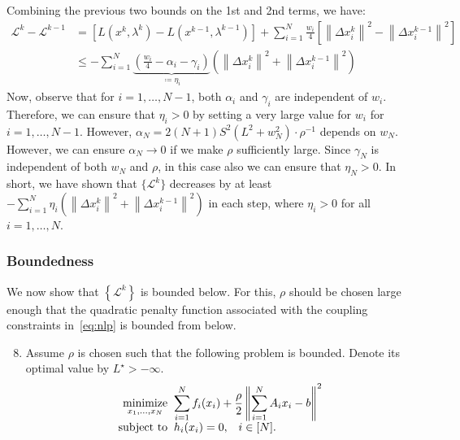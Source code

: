 \documentclass[11pt]{article}
\newcommand{\norm}[1]{\left\lVert #1 \right\rVert}
\begin{document}
Combining the previous two bounds on the 1st and 2nd terms, we have:
\begin{align*}
\mathcal{L}^k - \mathcal{L}^{k-1} &= \left[ L(x^k, \lambda^k) - L(x^{k-1}, \lambda^{k-1}) \right] + \sum_{i=1}^N \frac{w_i}{4} \left[\norm{\Delta x_i^k}^2 - \norm{\Delta x_i^{k-1}}^2 \right] \\
&\leq -\sum_{i=1}^N \underset{\coloneqq \eta_i}{\underbrace{\left(\frac{w_i}{4} - \alpha_i - \gamma_i\right)}}\left(\norm{\Delta x_i^k}^2 + \norm{\Delta x_i^{k-1}}^2\right) 
\end{align*}
Now, observe that for $i =1, \ldots, N-1$, both $\alpha_i$ and $\gamma_i$ are independent of $w_i$. Therefore, we can ensure that $\eta_i > 0$ by setting a very large value for $w_i$ for $i = 1, \ldots, N-1$.
However, $\alpha_N = 2(N+1)S^2(L^2 + w_N^2)\cdot \rho^{-1}$ depends on $w_N$. However, we can ensure $\alpha_N \to 0$ if we make $\rho$ sufficiently large. 
Since $\gamma_N$ is independent of both $w_N$ and $\rho$, in this case also we can ensure that $\eta_N > 0$.
In short, we have shown that $\{\mathcal{L}^k\}$ decreases by at least $-\sum_{i=1}^N \eta_i \left(\norm{\Delta x_i^k}^2 + \norm{\Delta x_i^{k-1}}^2\right)$ in each step, where $\eta_i > 0$ for all $i = 1, \ldots, N$.

\subsubsection{Boundedness}\label{sec:lyapunov_bounded}
We now show that $\left\{\mathcal{L}^k\right\}$ is bounded below.
For this, $\rho$ should be chosen large enough that the quadratic penalty function associated with the coupling constraints in~\eqref{eq:nlp} is bounded from below.
\begin{enumerate}\setcounter{enumi}{7}
    \item\label{assume:penalty} Assume $\rho$ is chosen such that the following problem is bounded. Denote its optimal value by $L^\star > -\infty$.
    \[
    \begin{array}{r@{\;\;}l}
    \displaystyle\mathop{\text{minimize}}_{x_1, \ldots, x_N} & \displaystyle \sum_{i = 1}^N f_i(x_i) + \frac{\rho}{2} \norm{\sum_{i=1}^N A_ix_i - b}^2  \\
    \text{subject to} & \displaystyle  h_i(x_i) = 0, \;\;\; i \in [N].
    \end{array}
    \]
\end{enumerate}
\end{document}
